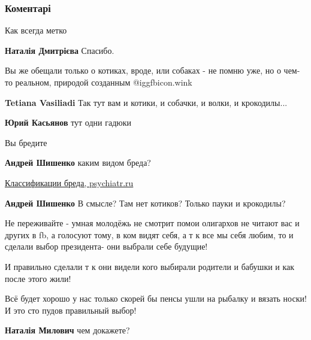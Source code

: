  
 
 
 
 
\subsubsection{Коментарі}

\begin{itemize} %
Как всегда метко


\textbf{Наталія Дмитрієва} Спасибо.

Вы же обещали только о котиках, вроде, или собаках - не помню уже, но о чем-то реальном, природой созданным @igg{fbicon.wink} 

\begin{itemize} %

\textbf{Tetiana Vasiliadi} Так тут вам и котики, и собачки, и волки, и крокодилы...

\textbf{Юрий Касьянов} тут одни гадюки

Вы бредите

\textbf{Андрей Шишенко} каким видом бреда? 

\href{https://psychiatr.ru/education/slide/347}{%
Классификации бреда, psychiatr.ru%
}

\textbf{Андрей Шишенко} В смысле? Там нет котиков? Только пауки и крокодилы?
\end{itemize} %


Не переживайте - умная молодёжь не смотрит помои олигархов не читают вас и
других в fb, а голосуют тому, в ком видят себя, а т к все мы себя любим, то и
сделали выбор президента- они выбрали себе будущие!

И правильно сделали т к они видели кого выбирали родители и бабушки и как после
этого жили!

Всё будет хорошо у нас только скорей бы пенсы ушли на рыбалку и вязать носки! И
это сто пудов правильный выбор!

\begin{itemize} %
\textbf{Наталія Милович} чем докажете?


\end{itemize}
\end{itemize}
